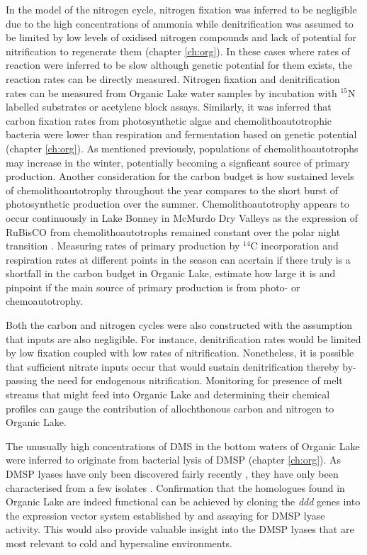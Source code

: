 In the model of the nitrogen cycle, nitrogen fixation was inferred to be negligible due to the high concentrations of ammonia while denitrification was assumed to be limited by low levels of oxidised nitrogen compounds and lack of potential for nitrification to regenerate them (chapter \ref{ch:org}).
In these cases where rates of reaction were inferred to be slow although genetic potential for them exists, the reaction rates can be directly measured.
Nitrogen fixation and denitrification rates can be measured from Organic Lake water samples by incubation with $^{15}$N labelled substrates or acetylene block assays.
Similarly, it was inferred that carbon fixation rates from photosynthetic algae and chemolithoautotrophic bacteria were lower than respiration and fermentation based on genetic potential (chapter \ref{ch:org}).
As mentioned previously, populations of chemolithoautotrophs may increase in the winter, potentially becoming a signficant source of primary production.
Another consideration for the carbon budget is how sustained levels of chemolithoautotrophy throughout the year compares to the short burst of photosynthetic production over the summer.
Chemolithoautotrophy appears to occur continuously in Lake Bonney in McMurdo Dry Valleys as the expression of \acs{RuBisCO} from chemolithoautotrophs remained constant over the polar night transition \cite{Kong2012b}.
Measuring rates of primary production by $^{14}$C incorporation and respiration rates at different points in the season can acertain if there truly is a shortfall in the carbon budget in Organic Lake, estimate how large it is and pinpoint if the main source of primary production is from photo- or chemoautotrophy.

Both the carbon and nitrogen cycles were also constructed with the assumption that inputs are also negligible.
For instance, denitrification rates would be limited by low fixation coupled with low rates of nitrification.
Nonetheless, it is possible that sufficient nitrate inputs occur that would sustain denitrification thereby by-passing the need for endogenous nitrification.
Monitoring for presence of melt streams that might feed into Organic Lake and determining their chemical profiles can gauge the contribution of allochthonous carbon and nitrogen to Organic Lake.

The unusually high concentrations of \ac{DMS} in the bottom waters of Organic Lake were inferred to originate from bacterial lysis of \ac{DMSP} (chapter \ref{ch:org}).
As \ac{DMSP} lyases have only been discovered fairly recently \cite{Todd2007, Curson2008}, they have only been characterised from a few isolates \cite{Todd2007, Curson2008, Curson2010, Todd2010, Curson2012}.
Confirmation that the homologues found in Organic Lake are indeed functional can be achieved by cloning the \emph{ddd} genes into the expression vector system established by \citet{Todd2007} and assaying for \ac{DMSP} lyase activity.
This would also provide valuable insight into the \ac{DMSP} lyases that are most relevant to cold and hypersaline environments.


